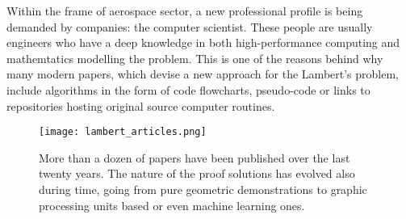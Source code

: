Within the frame of aerospace sector, a new professional profile is being
demanded by companies: the computer scientist. These people are usually
engineers who have a deep knowledge in both high-performance computing and
mathemtatics modelling the problem. This is one of the reasons behind why many
modern papers, which devise a new approach for the Lambert's problem, include
algorithms in the form of code flowcharts, pseudo-code or links to repositories
hosting original source computer routines.

\begin{figure}[h]
  \centering
  \texttt{[image: lambert\_articles.png]}
  \caption{More than a dozen of papers have been published over the last twenty
    years. The nature of the proof solutions has evolved also during time, going
    from pure geometric demonstrations to graphic processing units based or even machine
    learning ones.}
  \label{fig:art_lambert}
\end{figure}

